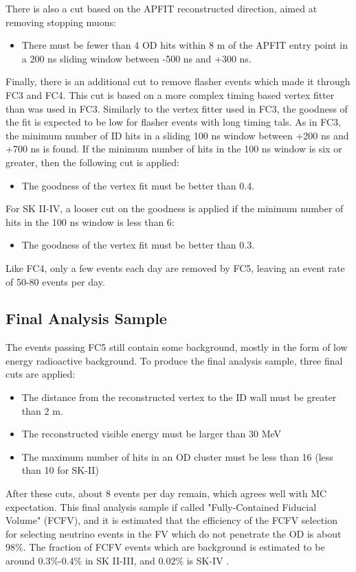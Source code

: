 \par 
There is also a cut based on the APFIT reconstructed direction, aimed at removing stopping muons:
\begin{itemize}
\item There must be fewer than 4 OD hits within 8 m of the APFIT entry point in a 200 ns sliding window between -500 ns and +300 ns.
\end{itemize}
\par
Finally, there is an additional cut to remove flasher events which made it through FC3 and FC4.  This cut is based on a more complex timing based vertex fitter than was used in FC3.  Similarly to the vertex fitter used in FC3, the goodness of the fit is expected to be low for flasher events with long timing tals.  As in FC3, the minimum number of ID hits in a sliding 100 ns window between +200 ns and +700 ns is found.  If the minimum number of hits in the 100 ns window is six or greater, then the following cut is applied:
\begin{itemize}
\item The goodness of the vertex fit must be better than 0.4.
\end{itemize}
For SK II-IV, a looser cut on the goodness is applied if the minimum number of hits in the 100 ns window is less than 6:
\begin{itemize}
\item The goodness of the vertex fit must be better than 0.3.
\end{itemize}
Like FC4, only a few events each day are removed by FC5, leaving an event rate of 50-80 events per day. 
\subsection{Final Analysis Sample}
The events passing FC5 still contain some background, mostly in the form of low energy radioactive background.   To produce the final analysis sample, three final cuts are applied:
\begin{itemize}
\item The distance from the reconstructed vertex to the ID wall must be greater than 2 m.
\item The reconstructed visible energy must be larger than 30 MeV
\item The maximum number of hits in an OD cluster must be less than 16 (less than 10 for SK-II)
\end{itemize}
After these cuts, about 8 events per day remain, which agrees well with MC expectation.  This final analysis sample if called "Fully-Contained Fiducial Volume" (FCFV), and it is estimated that the efficiency of the FCFV selection for selecting neutrino events in the FV which do not penetrate the OD is about 98\%.  The fraction of FCFV events which are background is estimated to be around 0.3\%-0.4\% in SK II-III, and 0.02\% is SK-IV \cite{Richardson:2015kd}.